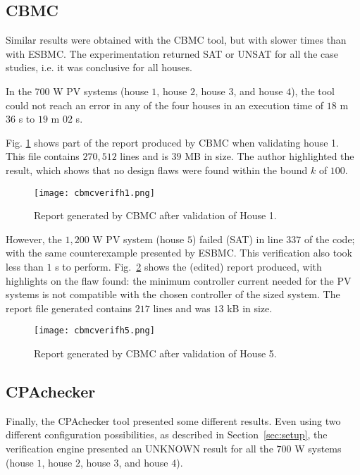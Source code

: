 \subsection{CBMC}

Similar results were obtained with the CBMC tool, but with slower times than with ESBMC. The experimentation returned SAT or UNSAT for all the case studies, i.e. it was conclusive for all houses. 

In the 700 W PV systems (house $1$, house $2$, house $3$, and house $4$), the tool could not reach an error in any of the four houses in an execution time of $18$ m $36$ s to $19$ m $02$ s. 

Fig. \ref{fig:cbmcverifhouse1} shows part of the report produced by CBMC when validating house 1. This file contains $270,512$ lines and is $39$ MB in size. The author highlighted the result, which shows that no design flaws were found within the bound $k$ of $100$.

\begin{figure}[h]
\texttt{[image: cbmcverifh1.png]}
\centering
\caption{Report generated by CBMC after validation of House 1.}
\label{fig:cbmcverifhouse1}
\end{figure}

However, the $1,200$ W PV system (house $5$) failed (SAT) in line $337$ of the code; with the same counterexample presented by ESBMC. This verification also took less than $1$ s to perform. Fig.~\ref{fig:cbmcverifhouse5} shows the (edited) report produced, with highlights on the flaw found: the minimum controller current needed for the PV systems is not compatible with the chosen controller of the sized system. The report file generated contains $217$ lines and was $13$ kB in size.

\begin{figure}[h]
\texttt{[image: cbmcverifh5.png]}
\centering
\caption{Report generated by CBMC after validation of House 5.}
\label{fig:cbmcverifhouse5}
\end{figure}


\subsection{CPAchecker}

Finally, the CPAchecker tool presented some different results. Even using two different configuration possibilities, as described in Section~\ref{sec:setup}, the verification engine presented an UNKNOWN result for all the $700$ W systems (house $1$, house $2$, house $3$, and house $4$). 

